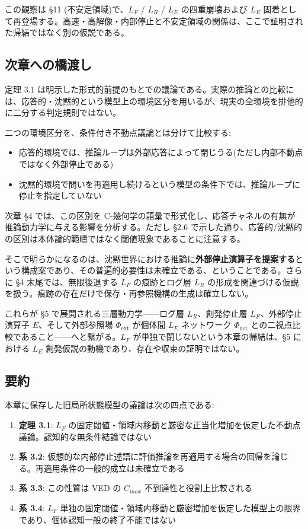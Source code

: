この観察は \S{}11 (不安定領域)で、$L_F$ / $L_R$ / $L_E$ の四重崩壊および $L_E$ 固着として再登場する。高速・高解像・内部停止と不安定領域の関係は、ここで証明された帰結ではなく別の仮説である。

\bigskip


\subsection{次章への橋渡し}


定理 3.1 は明示した形式的前提のもとでの議論である。実際の推論との比較には、応答的・沈黙的という模型上の環境区分を用いるが、現実の全環境を排他的に二分する判定規則ではない。

二つの環境区分を、条件付き不動点議論とは分けて比較する:

\begin{itemize}
\item 応答的環境では、推論ループは外部応答によって閉じうる(ただし内部不動点ではなく外部停止である)
\item 沈黙的環境で問いを再適用し続けるという模型の条件下では、推論ループに停止を指定していない
\end{itemize}


次章 \S{}4 では、この区別を C-幾何学の語彙で形式化し、応答チャネルの有無が推論動力学に与える影響を分析する。ただし \S{}2.6 で示した通り、応答的/沈黙的の区別は本体論的範疇ではなく閾値現象であることに注意する。

そこで明らかになるのは、沈黙世界における推論に\textbf{外部停止演算子を提案する}という構成案であり、その普遍的必要性は未確立である、ということである。さらに \S{}4 末尾では、無限後退する $L_F$ の痕跡とログ層 $L_R$ の形成を関連づける仮説を扱う。痕跡の存在だけで保存・再参照機構の生成は確立しない。

これらが \S{}5 で展開される三層動力学——ログ層 $L_R$、創発停止層 $L_E$、外部停止演算子 $E$、そして外部参照場 $\Phi_{\text{ext}}$ が個体間 $L_E$ ネットワーク $\Phi_{\text{net}}$ との二視点比較であること——へと繋がる。$L_F$ が単独で閉じないという本章の帰結は、\S{}5 における $L_E$ 創発仮説の動機であり、存在や収束の証明ではない。

\bigskip


\subsection{要約}


本章に保存した旧局所状態模型の議論は次の四点である:

\begin{enumerate}
\item \textbf{定理 3.1}: $L_F$ の固定閾値・領域内移動と厳密な正当化増加を仮定した不動点議論。認知的な無条件結論ではない
\item \textbf{系 3.2}: 仮想的な内部停止述語に評価推論を再適用する場合の回帰を論じる。再適用条件の一般的成立は未確立である
\item \textbf{系 3.3}: この性質は VED の $C_{max}$ 不到達性と役割上比較される
\item \textbf{系 3.4}: $L_F$ 単独の固定閾値・領域内移動と厳密増加を仮定した模型上の限界であり、個体認知一般の終了不能ではない
\end{enumerate}


